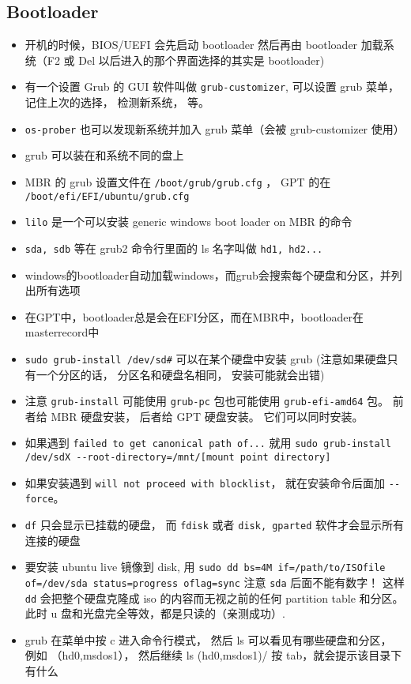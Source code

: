 \subsection{Bootloader}
\begin{itemize}
\item 开机的时候，BIOS/UEFI 会先启动 bootloader 然后再由 bootloader 加载系统（F2 或 Del 以后进入的那个界面选择的其实是 bootloader)
\item 有一个设置 Grub 的 GUI 软件叫做 \verb`grub-customizer`, 可以设置 grub 菜单， 记住上次的选择， 检测新系统， 等。
\item \verb`os-prober` 也可以发现新系统并加入 grub 菜单（会被 grub-customizer 使用）
\item grub 可以装在和系统不同的盘上
\item MBR 的 grub 设置文件在 \verb`/boot/grub/grub.cfg` ， GPT 的在 \verb`/boot/efi/EFI/ubuntu/grub.cfg`
\item \verb`lilo` 是一个可以安装 generic windows boot loader on MBR 的命令
\item \verb`sda, sdb` 等在 grub2 命令行里面的 ls 名字叫做 \verb`hd1, hd2...`
\item windows的bootloader自动加载windows，而grub会搜索每个硬盘和分区，并列出所有选项
\item 在GPT中，bootloader总是会在EFI分区，而在MBR中，bootloader在masterrecord中
\item \verb`sudo grub-install /dev/sd#` 可以在某个硬盘中安装 grub (注意如果硬盘只有一个分区的话， 分区名和硬盘名相同， 安装可能就会出错)
\item 注意 \verb`grub-install` 可能使用 \verb`grub-pc` 包也可能使用 \verb`grub-efi-amd64` 包。 前者给 MBR 硬盘安装， 后者给 GPT 硬盘安装。 它们可以同时安装。
\item 如果遇到 \verb`failed to get canonical path of...` 就用 \verb`sudo grub-install /dev/sdX --root-directory=/mnt/[mount point directory]`
\item 如果安装遇到 \verb`will not proceed with blocklist`， 就在安装命令后面加 \verb`--force`。
\item \verb`df` 只会显示已挂载的硬盘， 而 \verb`fdisk` 或者 \verb`disk, gparted` 软件才会显示所有连接的硬盘
\item 要安装 ubuntu live 镜像到 disk, 用 \verb`sudo dd bs=4M if=/path/to/ISOfile of=/dev/sda status=progress oflag=sync` 注意 \verb`sda` 后面不能有数字！ 这样 \verb`dd` 会把整个硬盘克隆成 iso 的内容而无视之前的任何 partition table 和分区。 此时 u 盘和光盘完全等效，都是只读的（亲测成功）.
\item grub 在菜单中按 c 进入命令行模式， 然后 ls 可以看见有哪些硬盘和分区， 例如 （hd0,msdos1）， 然后继续 ls (hd0,msdos1)/ 按 tab，就会提示该目录下有什么

\end{itemize}
